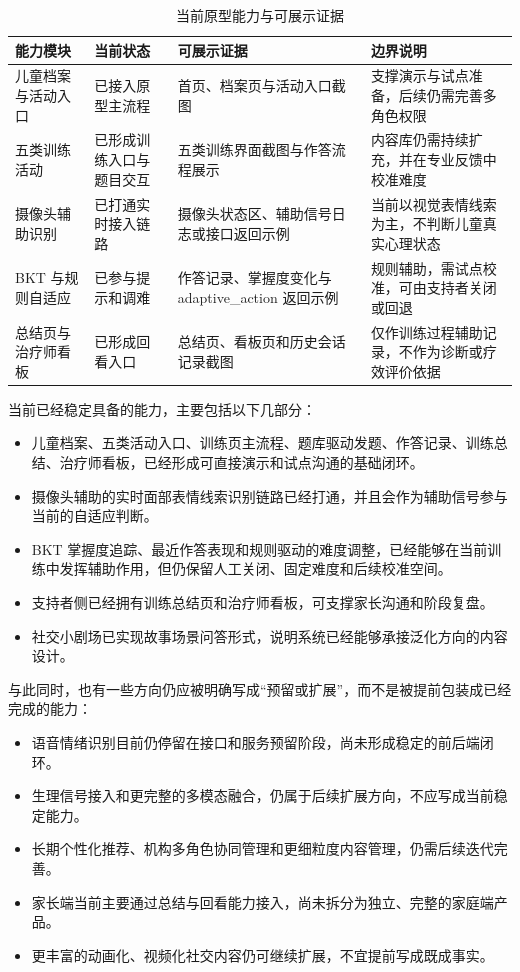 \begin{table}[H]
\centering
\caption{当前原型能力与可展示证据}
\small
\begin{tabularx}{0.98\textwidth}{>{\raggedright\arraybackslash}p{} >{\raggedright\arraybackslash}p{} >{\raggedright\arraybackslash}p{} X}
\toprule
能力模块 & 当前状态 & 可展示证据 & 边界说明 \\
\midrule
儿童档案与活动入口 & 已接入原型主流程 & 首页、档案页与活动入口截图 & 支撑演示与试点准备，后续仍需完善多角色权限 \\
五类训练活动 & 已形成训练入口与题目交互 & 五类训练界面截图与作答流程展示 & 内容库仍需持续扩充，并在专业反馈中校准难度 \\
摄像头辅助识别 & 已打通实时接入链路 & 摄像头状态区、辅助信号日志或接口返回示例 & 当前以视觉表情线索为主，不判断儿童真实心理状态 \\
BKT 与规则自适应 & 已参与提示和调难 & 作答记录、掌握度变化与 adaptive\_action 返回示例 & 规则辅助，需试点校准，可由支持者关闭或回退 \\
总结页与治疗师看板 & 已形成回看入口 & 总结页、看板页和历史会话记录截图 & 仅作训练过程辅助记录，不作为诊断或疗效评价依据 \\
\bottomrule
\end{tabularx}
\end{table}

当前已经稳定具备的能力，主要包括以下几部分：

\begin{itemize}
  \item 儿童档案、五类活动入口、训练页主流程、题库驱动发题、作答记录、训练总结、治疗师看板，已经形成可直接演示和试点沟通的基础闭环。
  \item 摄像头辅助的实时面部表情线索识别链路已经打通，并且会作为辅助信号参与当前的自适应判断。
  \item BKT 掌握度追踪、最近作答表现和规则驱动的难度调整，已经能够在当前训练中发挥辅助作用，但仍保留人工关闭、固定难度和后续校准空间。
  \item 支持者侧已经拥有训练总结页和治疗师看板，可支撑家长沟通和阶段复盘。
  \item 社交小剧场已实现故事场景问答形式，说明系统已经能够承接泛化方向的内容设计。
\end{itemize}

与此同时，也有一些方向仍应被明确写成“预留或扩展”，而不是被提前包装成已经完成的能力：

\begin{itemize}
  \item 语音情绪识别目前仍停留在接口和服务预留阶段，尚未形成稳定的前后端闭环。
  \item 生理信号接入和更完整的多模态融合，仍属于后续扩展方向，不应写成当前稳定能力。
  \item 长期个性化推荐、机构多角色协同管理和更细粒度内容管理，仍需后续迭代完善。
  \item 家长端当前主要通过总结与回看能力接入，尚未拆分为独立、完整的家庭端产品。
  \item 更丰富的动画化、视频化社交内容仍可继续扩展，不宜提前写成既成事实。
\end{itemize}

